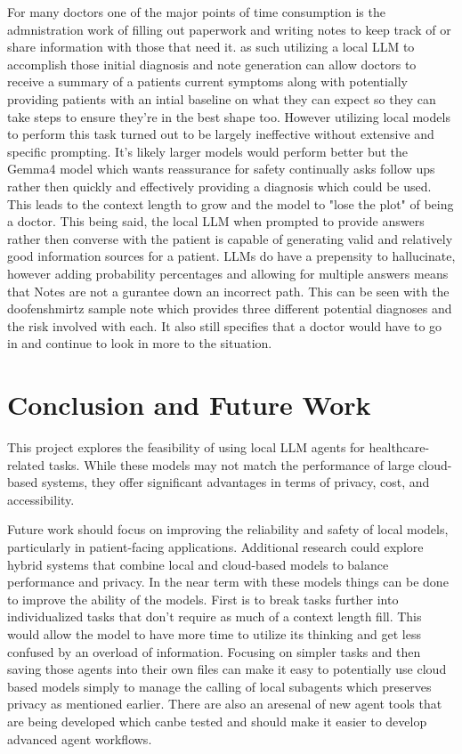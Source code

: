 \documentclass[sigconf]{acmart}
\begin{document}
For many doctors one of the major points of time consumption is the admnistration work of filling out paperwork and writing notes to keep track of or share information with those that need it. as such utilizing a local LLM to accomplish those initial diagnosis and note generation can allow doctors to receive a summary of a patients current symptoms along with potentially providing patients with an intial baseline on what they can expect so they can take steps to ensure they're in the best shape too. However utilizing local models to perform this task turned out to be largely ineffective without extensive and specific prompting. It's likely larger models would perform better but the Gemma4 model which wants reassurance for safety continually asks follow ups rather then quickly and effectively providing a diagnosis which could be used. This leads to the context length to grow and the model to "lose the plot" of being a doctor. This being said, the local LLM when prompted to provide answers rather then converse with the patient is capable of generating valid and relatively good information sources for a patient. LLMs do have a prepensity to hallucinate, however adding probability percentages and allowing for multiple answers means that Notes are not a gurantee down an incorrect path. This can be seen with the doofenshmirtz sample note which provides three different potential diagnoses and the risk involved with each. It also still specifies that a doctor would have to go in and continue to look in more to the situation.



\section{Conclusion and Future Work}

This project explores the feasibility of using local LLM agents for healthcare-related tasks. While these models may not match the performance of large cloud-based systems, they offer significant advantages in terms of privacy, cost, and accessibility. 

Future work should focus on improving the reliability and safety of local models, particularly in patient-facing applications. Additional research could explore hybrid systems that combine local and cloud-based models to balance performance and privacy. In the near term with these models things can be done to improve the ability of the models. First is to break tasks further into individualized tasks that don't require as much of a context length fill. This would allow the model to have more time to utilize its thinking and get less confused by an overload of information. Focusing on simpler tasks and then saving those agents into their own files can make it easy to potentially use cloud based models simply to manage the calling of local subagents which preserves privacy as mentioned earlier. There are also an aresenal of new agent tools that are being developed which canbe tested and should make it easier to develop advanced agent workflows. 
\end{document}
